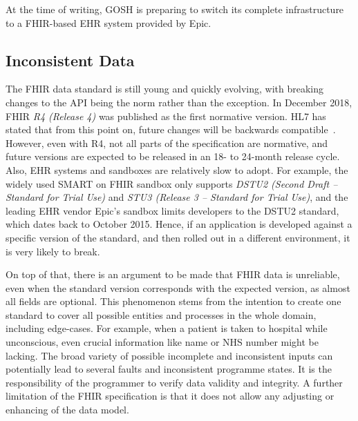 \documentclass[sigconf]{acmart}
\begin{document}
At the time of writing, GOSH is preparing to switch its complete infrastructure to a FHIR-based EHR system provided by Epic.%


\subsection{Inconsistent Data} 
\label{sec:challenge-data}

The FHIR data standard is still young and quickly evolving, with breaking changes to the API being the norm rather than the exception.%
In December 2018, FHIR \textit{R4 (Release 4)} was published as the first normative version. HL7 has stated that from this point on, future changes will be backwards compatible~\cite{fhir-r4-release}. However, even with R4, not all parts of the specification are normative, and future versions are expected to be released in an  18- to 24-month release cycle. Also, EHR systems and sandboxes are relatively slow to adopt. For example, the widely used SMART on FHIR sandbox only supports \textit{DSTU2 (Second Draft -- Standard for Trial Use)} and \textit{STU3 (Release 3 -- Standard for Trial Use)}, and the leading EHR vendor Epic's sandbox limits developers to the DSTU2 standard, which dates back to October 2015. Hence, if an application is developed against a specific version of the standard, and then rolled out in a different environment, it is very likely to break.

On top of that, there is an argument to be made that FHIR data is unreliable, even when the standard version corresponds with the expected version, as almost all fields are optional. This phenomenon stems from the intention to create one standard to cover all possible entities and processes in the whole  domain, including edge-cases. For example, when a patient is taken to hospital while unconscious, even crucial information like name or NHS number might be lacking. The broad variety of possible incomplete and inconsistent inputs can potentially lead to several faults and inconsistent programme states. It is the responsibility of the programmer to verify data validity and integrity. A further limitation of the FHIR specification is that it does not allow any adjusting or enhancing of the data model.%
\end{document}
